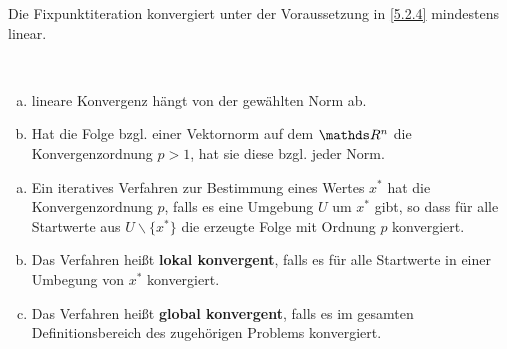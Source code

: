 \begin{Beme}
  Die Fixpunktiteration konvergiert unter der Voraussetzung in \ref{5.2.4} mindestens linear.
\end{Beme}


\begin{Beme}~
  \begin{enumerate}[a)]
  \item  lineare Konvergenz hängt von der gewählten Norm ab.
  \item Hat die Folge bzgl. einer Vektornorm auf dem $\R^n$ die Konvergenzordnung $p>1$,
    hat sie diese bzgl. jeder Norm.
  \end{enumerate}
\end{Beme}


\begin{Defe}
  \label{5.3.4}
  \begin{enumerate}[a)]
  \item Ein iteratives Verfahren zur Bestimmung eines Wertes $x^{*}$ hat 
    die Konvergenzordnung $p$, falls es eine Umgebung $U$ um $x^{*}$ gibt, 
    so dass für alle Startwerte aus $U\backslash \{x^{*}\}$ die erzeugte Folge mit Ordnung $p$ konvergiert.
  \item Das Verfahren heißt \textbf{lokal konvergent},
    falls es für alle Startwerte in einer Umbegung von $x^{*}$ konvergiert.
  \item Das Verfahren heißt \textbf{global konvergent},
    falls es im gesamten Definitionsbereich des zugehörigen Problems konvergiert.
  \end{enumerate}
\end{Defe} 


